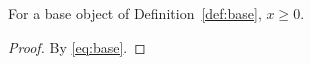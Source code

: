 
\begin{lemma}\label{lem:helper}
For a base object of Definition~\ref{def:base}, $x \ge 0$.
\end{lemma}

\begin{proof}
By \eqref{eq:base}.
\end{proof}
